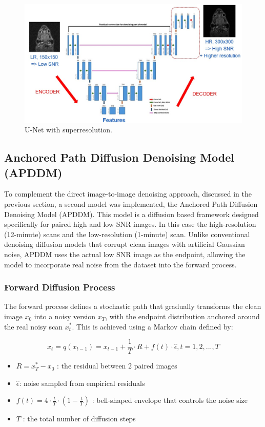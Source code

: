 \documentclass[twocolumn]{article}
\begin{document}
\begin{figure}
    \centering
    \includegraphics[width=0.85\linewidth]{U-Net with superresolution.jpg}
    \caption{U-Net with superresolution.}
    \label{fig:U-Net superres}
\end{figure}



\subsection{Anchored Path Diffusion Denoising Model (APDDM)}
To complement the direct image-to-image denoising approach, discussed in the previous section, a second model was implemented, the Anchored Path Diffusion Denoising Model (APDDM). This model is a diffusion based framework designed specifically for paired high and low SNR images. In this case the high-resolution (12-minute) scans and the low-resolution (1-minute) scan. Unlike conventional denoising diffusion models that corrupt clean images with artificial Gaussian noise, APDDM uses the actual low SNR image as the endpoint, allowing the model to incorporate real noise from the dataset into the forward process. 

\subsubsection{Forward Diffusion Process}
The forward process defines a stochastic path that gradually transforms the clean image $x_0$ into a noisy version $x_T$, with the endpoint distribution anchored around the real noisy scan $x_t^*$. 
This is achieved using a Markov chain defined by:

\begin{equation}\label{eq:Markov chain}
x_t=q(x_{t-1})=x_{t-1}+\frac{1}{T}\cdot R+f(t)\cdot \hat{\epsilon}, t=1,2,...,T
\end{equation}
\begin{itemize}
    \item $R=x_T^*-x_0$ : the residual between 2 paired images
    \item $\hat{\epsilon} $: noise sampled from empirical residuals
    \item $f(t)=4 \cdot \frac{t}{T} \cdot (1-\frac{t}{T})$ : bell-shaped envelope that controls the noise size
    \item $T$ : the total number of diffusion steps
\end{itemize}
\end{document}
